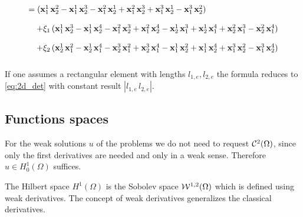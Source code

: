 \begin{equation}
\begin{array}{ll}
  

=  (\textbf{x}^1_1\,\textbf{x}^2_2 - \textbf{x}^1_1\,\textbf{x}^3_2 - \textbf{x}^2_1\,\textbf{x}^1_2 + \textbf{x}^2_1\,\textbf{x}^3_2 + \textbf{x}^3_1\,\textbf{x}^1_2 - \textbf{x}^3_1\,\textbf{x}^2_2)\\[4mm]
  
  \quad + \xi_1\,(\textbf{x}^1_1\,\textbf{x}^3_2-\textbf{x}^1_1\,\textbf{x}^4_2-\textbf{x}^2_1\,\textbf{x}^3_2+\textbf{x}^2_1\,\textbf{x}^4_2-\textbf{x}^1_2\,\textbf{x}^3_1+\textbf{x}^1_2\,\textbf{x}^4_1 +\textbf{x}^2_2\,\textbf{x}^3_1-\textbf{x}^2_2\,\textbf{x}^4_1)\\[4mm]
  
  \quad + \xi_2\,(\textbf{x}^1_2\,\textbf{x}^2_1-\textbf{x}^1_2\,\textbf{x}^4_1-\textbf{x}^3_2\,\textbf{x}^2_1+\textbf{x}^3_2\,\textbf{x}^4_1 - \textbf{x}^1_1\,\textbf{x}^2_2+\textbf{x}^1_1\,\textbf{x}^4_2+\textbf{x}^3_1\,\textbf{x}^2_2-\textbf{x}^3_1\,\textbf{x}^4_2)\\[4mm]

  \end{array}
\end{equation}
If one assumes a rectangular element with lengths $l_{1,e}, l_{2,e}$ the formula reduces to \eqref{eq:2d_det} with constant result $|l_{1,e}\,l_{2,e}|$.

\subsection{Functions spaces}
\label{sec:hilbert}
%
For the weak solutions $u$ of the problems we do not need to request $\mathcal{C}^2(\Omega)$, since only the first derivatives are needed and only in a weak sense. Therefore $u\in H^1_0(\Omega)$ suffices.

The Hilbert space $H^1(\Omega)$ is the Sobolev space $\mathcal{W}^{1,2}(\Omega)$ which is defined using weak derivatives. The concept of weak derivatives generalizes the classical derivatives.

